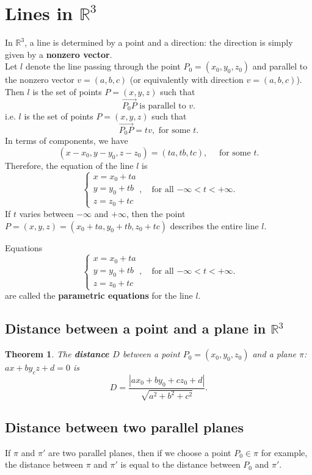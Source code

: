 \documentclass[a4paper, 12pt]{article}
\newtheorem{theorem}{Theorem}[section]
\newenvironment{definition}[1][Definition]{\begin{trivlist}
\item[\hskip \labelsep {\bfseries #1}]}{\end{trivlist}}
\newcommand{\keyword}[1]{\textbf{#1}}
\begin{document}
    \section{Lines in $\mathbb{R}^3$}
        In $\mathbb{R}^3$, a line is determined by a point and a direction:
        the direction is simply given by a \keyword{nonzero vector}.\\
        Let $l$ denote the line passing through the point $P_0 = (x_0, y_0, z_0)$
        and parallel to the nonzero vector $v = (a, b, c)$ (or equivalently
        with direction $v = (a, b, c)$).\\
        Then $l$ is the set of points $P = (x, y, z)$ such that
        \[ \overrightarrow{P_0P} \text{ is parallel to } v. \]
        i.e. $l$ is the set of points $P = (x, y, z)$ such that
        \[ \overrightarrow{P_0P} = tv, \text{ for some } t. \]
        In terms of components, we have
        \begin{equation*}
            (x - x_0, y- y_0, z - z_0) = (ta, tb, tc), \quad \text{ for some }t.
        \end{equation*}
        Therefore, the equation of the line $l$ is
        \[
            \begin{cases}
                x = x_0 + ta \\
                y = y_0 + tb \\
                z = z_0 + tc
            \end{cases}
            , \quad
            \text{for all $-\infty < t < +\infty$.}
        \]
        If $t$ varies between $-\infty$ and $+\infty$, then the point $P = (x, y, z)
        = (x_0 + ta, y_0 + tb, z_0 + tc)$ describes the entire line $l$.
        \begin{definition}
            Equations
            \[
                \begin{cases}
                    x = x_0 + ta \\
                    y = y_0 + tb \\
                    z = z_0 + tc
                \end{cases}
                , \quad
                \text{for all $-\infty < t < +\infty$.}
            \]
            are called the \keyword{parametric equations} for the line $l$.
        \end{definition}
        \subsection*{Distance between a point and a plane in $\mathbb{R}^3$}
            \begin{theorem}
                The \keyword{distance $D$} between a point $P_0 = (x_0, y_0, z_0)$ and a plane
                $\pi$: $ax + by _ cz + d = 0$ is
                \begin{equation*}
                    D = \frac{|ax_0 + by_0 + cz_0 + d|}{\sqrt{a^2 + b^2 + c^2}}.
                \end{equation*}
            \end{theorem}
        \subsection*{Distance between two parallel planes}
            If $\pi$ and $\pi'$ are two parallel planes, then if we choose a point
            $P_0 \in \pi$ for example, the distance between $\pi$ and $\pi'$ is equal to
            the distance between $P_0$ and $\pi'$.
\end{document}
